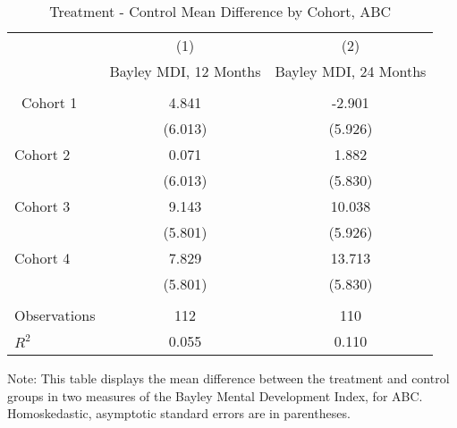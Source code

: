 \begin{table}[H] 
\begin{threeparttable}
\caption{Treatment - Control Mean Difference by Cohort, ABC}
\label{table:cohorts}
\centering 
\begin{tabular}{lcc} \toprule
 & (1) & (2) \\
 & Bayley MDI, 12 Months & Bayley MDI, 24 Months \\ \midrule
 &  &  \\\
Cohort 1 & 4.841 & -2.901 \\
 & (6.013) & (5.926) \\
Cohort 2 & 0.071 & 1.882 \\
 & (6.013) & (5.830) \\
Cohort 3 & 9.143 & 10.038 \\
 & (5.801) & (5.926) \\
Cohort 4 & 7.829 & 13.713 \\
 & (5.801) & (5.830) \\ \\ \midrule
Observations & 112 & 110 \\
$R^2$ & 0.055 & 0.110 \\ \bottomrule
 \end{tabular}
\begin{tablenotes}
\footnotesize
\item Note: This table displays the mean difference between the treatment and control groups in two measures of the Bayley Mental Development Index, for ABC. Homoskedastic, asymptotic standard errors are in parentheses.
\end{tablenotes}
\end{threeparttable}
\end{table}